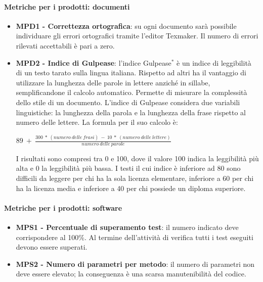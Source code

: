 \documentclass[11pt,a4paper]{article}
\begin{document}
{\begin{itemize}
	\end{itemize}
	
	
	\paragraph{Metriche per i prodotti: documenti} 
	\begin{itemize}
		\item \textbf{MPD1 - Correttezza ortografica}: su ogni documento sarà possibile individuare gli errori ortografici tramite l'editor Texmaker. Il numero di errori rilevati accettabili è pari a zero.
	
		\item \textbf{MPD2 - Indice di Gulpease}: l'indice Gulpease$^*$ è un indice di leggibilità di un testo tarato sulla lingua italiana. Rispetto ad altri ha il vantaggio di utilizzare la lunghezza delle parole in lettere anziché in sillabe, semplificandone il calcolo automatico. Permette di misurare la complessità dello stile di un documento. L'indice di Gulpease considera due variabili linguistiche: la lunghezza della parola e la lunghezza della frase rispetto al numero delle lettere. La formula per il suo calcolo è:
	\begin{center}
		$89\ +\ \frac{300\ *\ (numero\ delle\ frasi)\ -\ 10\ *\ (numero\ delle\ lettere)}{numero\ delle\ parole}$
	\end{center}
	I risultati sono compresi tra 0 e 100, dove il valore 100 indica la leggibilità più alta e 0 la leggibilità più bassa. I testi il cui indice è inferiore ad 80 sono difficili da leggere per chi ha la sola licenza elementare, inferiore a 60 per chi ha la licenza media e inferiore a 40 per chi possiede un diploma superiore.
	
	\end{itemize}
	
	\paragraph{Metriche per i prodotti: software} 
	\begin{itemize}
		\item \textbf{MPS1 - Percentuale di superamento test}: il numero indicato deve corrispondere al 100\%. Al termine dell'attività di verifica tutti i test eseguiti devono essere superati.
		
	    \item \textbf{MPS2 - Numero di parametri per metodo}: il numero di parametri non deve essere elevato; la conseguenza è una scarsa manutenibilità del codice.
	

\end{itemize}}
\end{document}
